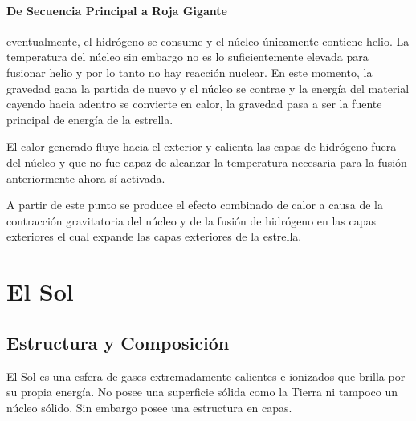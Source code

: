 \documentclass{tufte-handout}
\begin{document}
\paragraph{De Secuencia Principal a Roja Gigante} eventualmente, el hidrógeno se consume y el núcleo únicamente contiene helio. La temperatura del núcleo sin embargo no es lo suficientemente elevada para fusionar helio y por lo tanto no hay reacción nuclear. En este momento, la gravedad gana la partida de nuevo y el núcleo se contrae y la energía del material cayendo hacia adentro se convierte en calor, la gravedad pasa a ser la fuente principal de energía de la estrella.

El calor generado fluye hacia el exterior y calienta las capas de hidrógeno fuera del núcleo y que no fue capaz de alcanzar la temperatura necesaria para la fusión anteriormente ahora sí activada.


A partir de este punto se produce el efecto combinado de calor a causa de la contracción gravitatoria del núcleo y de la fusión de hidrógeno en las capas exteriores el cual expande las capas exteriores de la estrella.


\clearpage

\section{El Sol}

\subsection{Estructura y Composición}

El Sol es una esfera de gases extremadamente calientes e ionizados que brilla por su propia energía. No posee una superficie sólida como la Tierra ni tampoco un núcleo sólido. Sin embargo posee una estructura en capas.

\end{document}
